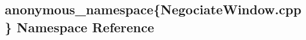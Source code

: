 \hypertarget{namespaceanonymous__namespace_02NegociateWindow_8cpp_03}{}\subsection{anonymous\+\_\+namespace\{Negociate\+Window.\+cpp\} Namespace Reference}
\label{namespaceanonymous__namespace_02NegociateWindow_8cpp_03}
